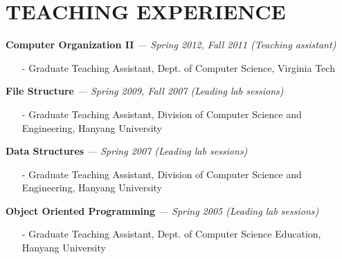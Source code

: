 \section{TEACHING EXPERIENCE} 
\vspace{0.07in} 
   {\bf Computer Organization II}
   {\it \footnotesize --- Spring 2012, Fall 2011 (Teaching assistant)}
    \begin{itemize}[leftmargin=*]
    \setlength\itemsep{-0.02in}
      \item[-] {\small Graduate Teaching Assistant, Dept. of Computer Science, Virginia
      Tech}
    \end{itemize}
\vspace{-0.15in}
   {\bf File Structure}
   {\it \footnotesize --- Spring 2009, Fall 2007 (Leading lab sessions)}
    \begin{itemize}[leftmargin=*]
    \setlength\itemsep{-0.02in}
      \item[-] {\small Graduate Teaching Assistant, Division of Computer Science and
      Engineering, Hanyang University}
    \end{itemize}
\vspace{-0.15in}
   {\bf Data Structures}
   {\it \footnotesize --- Spring 2007 (Leading lab sessions)}
    \begin{itemize}[leftmargin=*]
    \setlength\itemsep{-0.02in}
      \item[-] {\small Graduate Teaching Assistant, Division of Computer Science and
      Engineering, Hanyang University}
    \end{itemize}
\vspace{-0.15in}
   {\bf Object Oriented Programming}
   {\it \footnotesize --- Spring 2005 (Leading lab sessions)}
    \begin{itemize}[leftmargin=*]
    \setlength\itemsep{-0.02in}
      \item[-] {\small Graduate Teaching Assistant, Dept. of Computer Science
      Education, Hanyang University}
    \end{itemize}

